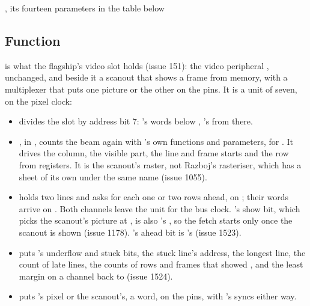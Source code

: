 
%
{, its fourteen parameters in the
table below}%
{}

\subsection*{Function}

 is what the flagship's video slot holds (issue 151): the
video peripheral , unchanged, and beside it a scanout that
shows a frame from memory, with a multiplexer that puts one picture or
the other on the pins. It is a unit of seven, on the pixel clock:

\begin{itemize}
\item {} divides the slot by address bit 7: 's
words below , 's from there.
\item {}, in , counts the beam
again with 's own functions and parameters, for
. It drives the column, the visible part, the line and
frame starts and the row from registers. It is the scanout's raster,
not Razboj's rasteriser, which has a sheet of its own under the same
name (issue 1055).
\item {} holds two lines and asks for each one or two
rows ahead, on ; their words arrive on . Both
channels leave the unit for the bus clock. 's show bit,
which picks the scanout's picture at , is also
's , so the fetch starts only once the
scanout is shown (issue 1178). 's ahead bit is
's  (issue 1523).
\item {} puts 's underflow and stuck bits,
the stuck line's address, the longest line, the count of late lines,
the counts of rows and frames that showed , and the least
margin on a channel back to  (issue 1524).
\item {} puts 's pixel or the scanout's, a
 word, on the pins, with 's syncs either
way.
\end{itemize}

